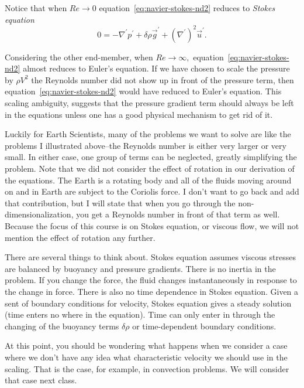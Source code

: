 \documentclass[12pt,twoside]{article}
\begin{document}
Notice that when $Re \rightarrow 0$ equation~\ref{eq:navier-stokes-nd2} reduces
to {\em Stokes equation}
\begin{equation}        
0 =  -\nabla^\prime p^\prime  + \delta\rho \vec g^\prime  + \left
(\nabla^\prime \right )^2 \vec u^\prime.
\label{eq:stokes-nd}
\end{equation}

Considering the other end-member, when $Re \rightarrow \infty ,$
equation~\ref{eq:navier-stokes-nd2} almost reduces to Euler's equation.  If we
have chosen to scale the pressure by $\rho V^2$ the Reynolds number did not show
up in front of the pressure term, then equation~\ref{eq:navier-stokes-nd2} would
have reduced to Euler's equation.   This scaling ambiguity, suggests that the
pressure gradient term should always be left in the equations unless one has a
good physical mechanism to get rid of it.  

Luckily for Earth Scientists, many of the problems we want to solve are like
the problems I illustrated above--the Reynolds number is either very larger
or very small.  In either case,  one group of terms can be
neglected,  greatly simplifying the problem.   Note that we did not consider the
effect of rotation in our derivation of the equations.  The Earth is a
rotating body and all of the fluids moving around on and in Earth are subject
to the Coriolis force.  I don't want to go back and add that contribution, but
I will state that when you go through the non-dimensionalization, you get a
Reynolds number in front of that term as well.   Because the focus of this
course is on Stokes equation, or viscous flow, we will not mention the
effect of rotation any further.

There are several things to think about.  Stokes equation assumes
viscous stresses are balanced by buoyancy and pressure gradients.   There is no
inertia in the problem.  If you change the force, the fluid changes
instantaneously in response to the change in force.  There is also no time
dependence in Stokes equation.   Given a sent of boundary conditions for
velocity, Stokes equation gives a steady solution (time enters no where in the
equation).   Time can only enter in through the changing of the buoyancy terms
$\delta \rho$ or time-dependent boundary conditions.

At this point, you should be wondering what happens when we consider a case
where we don't have any idea what characteristic velocity we should use in the
scaling.  That is the case, for example, in convection problems.   We will
consider that case next class.
\end{document}
